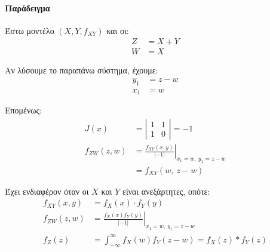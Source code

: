 \documentclass[11pt,a4paper,notitlepage,fleqn,final]{article}
\begin{document}
	\paragraph{Παράδειγμα}
	Έστω μοντέλο \( \left(X,Y,f_{XY}\right) \) και οι:
	\begin{align*}
		Z &= X+Y \\
		W &= X
	\end{align*}
	
	Αν λύσουμε το παραπάνω σύστημα, έχουμε:
	\begin{align*}
		y_1 &= z-w \\
		x_1 &= w
	\end{align*}
	
	Επομένως:
	\begin{align*}
		J(x) &= \left|\begin{matrix}
		1 & 1 \\ 1 & 0
		\end{matrix}\right| = -1\\
		f_{ZW}(z,w) &= \left. \frac{f_{XY}(x,y)}{|-1|}
		\right|_{x_1=w,\ y_1=z-w} \\ &= f_{XY}(w,\ z-w)
	\end{align*}
	
	Έχει ενδιαφέρον όταν οι \( X \) και \( Y \) είναι ανεξάρτητες,
	οπότε:
	\begin{align*}
		f_{XY}(x,y) &= f_X(x) \cdot f_Y(y) \\
		f_{ZW}(z,w) &= \left. \frac{f_X(x)f_Y(y)}{|-1|}\right|_{
			x_1=w,\ y_1=z-w} \\ 
		f_Z(z) &= \int_{-\infty}^{\infty} f_X(w)f_Y(z-w)
		= f_X(z) * f_Y(z)
	\end{align*}
\end{document}
